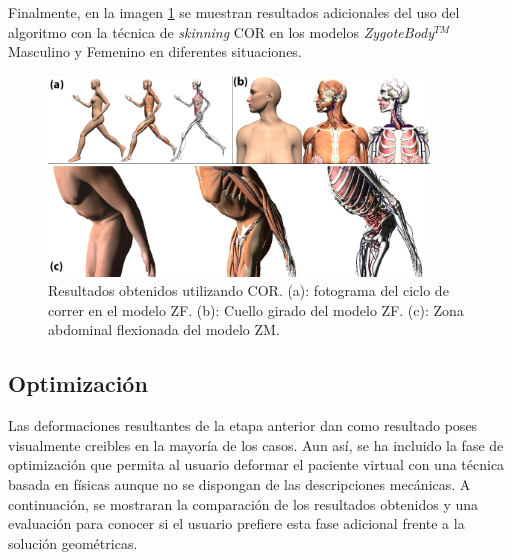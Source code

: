 Finalmente, en la imagen \ref{fig:run1} se muestran resultados adicionales del uso del algoritmo con la técnica de \emph{skinning} \ac{COR} en los modelos \emph{ZygoteBody}$^{TM}$ Masculino y Femenino en diferentes situaciones.

\begin{figure}%
   \centering
   \includegraphics[width=0.90\textwidth]{IMG/examples}
    \caption{Resultados obtenidos utilizando \ac{COR}. (a): fotograma del ciclo de correr en el modelo ZF. (b): Cuello girado del modelo ZF. (c): Zona abdominal flexionada del modelo ZM.}
    \label{fig:run1}
\end{figure}

\subsection{Optimización}
\label{posing:optimizacion}
Las deformaciones resultantes de la etapa anterior dan como resultado poses visualmente creibles en la mayoría de los casos. 
Aun así, se ha incluido la fase de optimización que permita al usuario deformar el paciente virtual con una técnica basada en físicas aunque no se dispongan de las descripciones mecánicas. A continuación, se mostraran la comparación de los resultados obtenidos y una evaluación para conocer si el usuario prefiere esta fase adicional frente a la solución geométricas.

